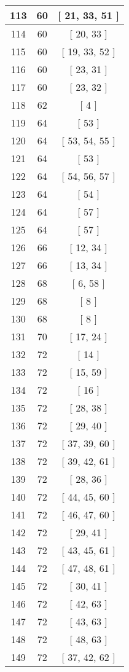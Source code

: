 \begin{center}
\begin{longtable}[H]{|| c c c ||}
113 & 60 & [ 21, 33, 51 ]
\\\hline
114 & 60 & [ 20, 33 ]
\\\hline
115 & 60 & [ 19, 33, 52 ]
\\\hline
116 & 60 & [ 23, 31 ]
\\\hline
117 & 60 & [ 23, 32 ]
\\\hline
118 & 62 & [ 4 ]
\\\hline
119 & 64 & [ 53 ]
\\\hline
120 & 64 & [ 53, 54, 55 ]
\\\hline
121 & 64 & [ 53 ]
\\\hline
122 & 64 & [ 54, 56, 57 ]
\\\hline
123 & 64 & [ 54 ]
\\\hline
124 & 64 & [ 57 ]
\\\hline
125 & 64 & [ 57 ]
\\\hline
126 & 66 & [ 12, 34 ]
\\\hline
127 & 66 & [ 13, 34 ]
\\\hline
128 & 68 & [ 6, 58 ]
\\\hline
129 & 68 & [ 8 ]
\\\hline
130 & 68 & [ 8 ]
\\\hline
131 & 70 & [ 17, 24 ]
\\\hline
132 & 72 & [ 14 ]
\\\hline
133 & 72 & [ 15, 59 ]
\\\hline
134 & 72 & [ 16 ]
\\\hline
135 & 72 & [ 28, 38 ]
\\\hline
136 & 72 & [ 29, 40 ]
\\\hline
137 & 72 & [ 37, 39, 60 ]
\\\hline
138 & 72 & [ 39, 42, 61 ]
\\\hline
139 & 72 & [ 28, 36 ]
\\\hline
140 & 72 & [ 44, 45, 60 ]
\\\hline
141 & 72 & [ 46, 47, 60 ]
\\\hline
142 & 72 & [ 29, 41 ]
\\\hline
143 & 72 & [ 43, 45, 61 ]
\\\hline
144 & 72 & [ 47, 48, 61 ]
\\\hline
145 & 72 & [ 30, 41 ]
\\\hline
146 & 72 & [ 42, 63 ]
\\\hline
147 & 72 & [ 43, 63 ]
\\\hline
148 & 72 & [ 48, 63 ]
\\\hline
149 & 72 & [ 37, 42, 62 ]
\\\hline

\end{longtable}
\end{center}
